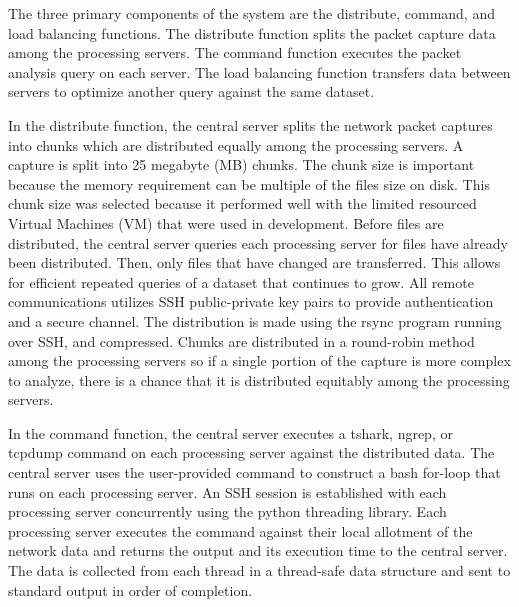 \documentclass{article}
\begin{document}
\begin{multicols}{2}
The three primary components of the system are the distribute, command, and load balancing functions. The distribute function splits the packet capture data among the processing servers. The command function executes the packet analysis query on each server.  The load balancing function transfers data between servers to optimize another query against the same dataset.

In the distribute function,  the central server splits the network packet captures into chunks which are distributed equally among the processing servers.  A capture is split into 25 megabyte (MB) chunks. The chunk size is important because the memory requirement can be multiple of the files size on disk. This chunk size was selected because it performed well with the limited resourced Virtual Machines (VM) that were used in development.  Before files are distributed, the central server queries each processing server for files have already been distributed. Then, only files that have changed are transferred.  This allows for efficient repeated queries of a dataset that continues to grow.  All remote communications utilizes SSH public-private key pairs to provide authentication and a secure channel.  The distribution is made using the rsync program running over SSH, and compressed.  Chunks are distributed in a round-robin method among the processing servers so if a single portion of the capture is more complex to analyze, there is a chance that it is distributed equitably among the processing servers.      

In the command function, the central server executes a tshark, ngrep, or tcpdump command on each processing server against the distributed data. The central server uses the user-provided command to construct a bash for-loop that runs on each processing server. An SSH session is established with each processing server concurrently using the python threading library.  Each processing server executes the command against their local allotment of the network data and returns the output and its execution time to the central server. The data is collected from each thread in a thread-safe data structure and sent to standard output in order of completion.


\end{multicols}
\end{document}
